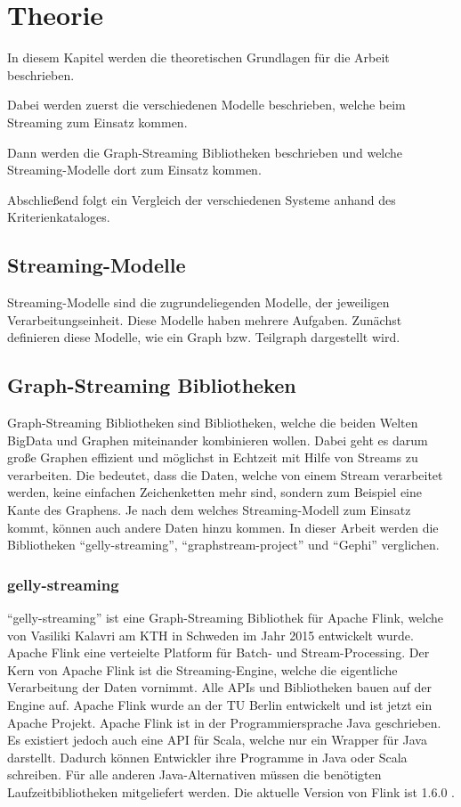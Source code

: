 \chapter{Theorie}
In diesem Kapitel werden die theoretischen Grundlagen für die Arbeit beschrieben.

Dabei werden zuerst die verschiedenen Modelle beschrieben, welche beim Streaming
zum Einsatz kommen.

Dann werden die Graph-Streaming Bibliotheken beschrieben und welche
Streaming-Modelle dort zum Einsatz kommen.

Abschließend folgt ein Vergleich der verschiedenen Systeme anhand des
Kriterienkataloges.

\section{Streaming-Modelle}
Streaming-Modelle sind die zugrundeliegenden Modelle, der
jeweiligen Verarbeitungseinheit. Diese Modelle haben mehrere Aufgaben. Zunächst
definieren diese Modelle, wie ein Graph bzw. Teilgraph dargestellt wird.


\section{Graph-Streaming Bibliotheken}
Graph-Streaming Bibliotheken sind Bibliotheken, welche die beiden Welten \gls{BigData}
und Graphen miteinander kombinieren wollen. Dabei geht es darum große Graphen
effizient und möglichst in Echtzeit mit Hilfe von Streams zu verarbeiten. Die
bedeutet, dass die Daten, welche von einem Stream verarbeitet werden, keine
einfachen Zeichenketten mehr sind, sondern zum Beispiel eine Kante des Graphens.
Je nach dem welches Streaming-Modell zum Einsatz kommt, können auch andere Daten
hinzu kommen. In dieser Arbeit werden die Bibliotheken \enquote{gelly-streaming},
\enquote{graphstream-project} und \enquote{Gephi} verglichen.

\subsection{gelly-streaming}
\enquote{gelly-streaming} ist eine Graph-Streaming Bibliothek für Apache Flink,
welche von Vasiliki Kalavri am KTH in Schweden im Jahr 2015 entwickelt wurde.
Apache Flink eine verteielte Platform für Batch- und Stream-Processing. Der Kern
von Apache Flink ist die Streaming-Engine, welche die eigentliche Verarbeitung
der Daten vornimmt. Alle \glspl{API} und Bibliotheken bauen auf der Engine auf.
Apache Flink wurde an der TU Berlin entwickelt und ist jetzt ein Apache Projekt.
Apache Flink ist in der Programmiersprache Java geschrieben. Es existiert jedoch
auch eine \gls{API} für Scala, welche nur ein Wrapper für Java darstellt. Dadurch
können Entwickler ihre Programme in Java oder Scala schreiben. Für alle anderen
Java-Alternativen müssen die benötigten Laufzeitbibliotheken mitgeliefert
werden. Die aktuelle Version von Flink ist 1.6.0 .

